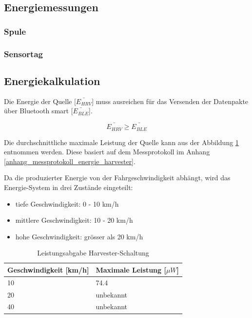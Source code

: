 \subsection{Energiemessungen}
\label{v_messungen_sensortag}

\subsubsection{Spule}


\subsubsection{Sensortag}




\subsection{Energiekalkulation}
\label{v_e_kalkulation}


Die Energie der Quelle [$\bar{E_{HRV}} $] muss ausreichen für das Versenden der Datenpakte über Bluetooth smart [$\bar{E_{BLE}}$].

\[\bar{E_{HRV}} \ge \bar{E_{BLE}}  \]


Die durchschnittliche maximale Leistung der Quelle kann aus der Abbildung \ref{MPP_Werte} entnommen werden. Diese basiert auf dem Messprotokoll im Anhang \ref{anhang_messprotokoll_energie_harvester}. 

Da die produzierter Energie von der Fahrgeschwindigkeit abhängt, wird das Energie-System in drei Zustände eingeteilt:

\begin{itemize}
    \item tiefe Geschwindigkeit: 0 - 10 km/h
    \item mittlere Geschwindigkeit: 10 - 20 km/h 
    \item hohe Geschwindigkeit: grösser als 20 km/h 
\end{itemize}

\begin{table}[ht]
\begin{tabular}{|l|l|}\hline \label{MPP_Werte} 
    Geschwindigkeit [km/h] & Maximale Leistung [$\mu W$] \\ \hline
    10 & 74.4 \\ \hline
    20 & unbekannt \\ \hline
    40 & unbekannt \\ \hline
\end{tabular}
\caption{Leistungsabgabe Harvester-Schaltung}
\end{table}

